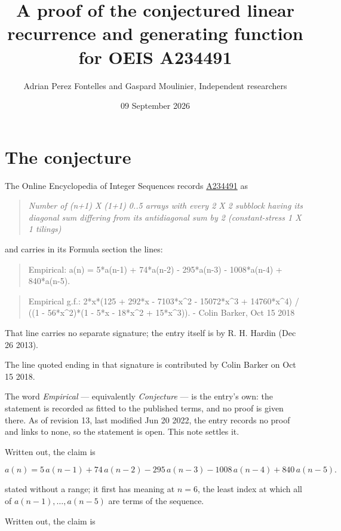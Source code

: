 \documentclass[11pt]{article}
\title{A proof of the conjectured linear recurrence and generating function for OEIS A234491}
\author{Adrian Perez Fontelles and Gaspard Moulinier, Independent researchers}
\date{09 September 2026}
\theoremstyle{definition}
\begin{document}
\maketitle
\section{The conjecture}

The Online Encyclopedia of Integer Sequences records \href{https://oeis.org/A234491}{A234491} as

\begin{quote}\itshape Number of (n+1) X (1+1) 0..5 arrays with every 2 X 2 subblock having its diagonal sum differing from its antidiagonal sum by 2 (constant-stress 1 X 1 tilings)\end{quote}

and carries in its Formula section the lines:

\begin{quote}\ttfamily Empirical: a(n) = 5*a(n-1) + 74*a(n-2) - 295*a(n-3) - 1008*a(n-4) + 840*a(n-5).\end{quote}

\begin{quote}\ttfamily Empirical g.f.: 2*x*(125 + 292*x - 7103*x\textasciicircum{}2 - 15072*x\textasciicircum{}3 + 14760*x\textasciicircum{}4) / ((1 - 56*x\textasciicircum{}2)*(1 - 5*x - 18*x\textasciicircum{}2 + 15*x\textasciicircum{}3)). - Colin Barker, Oct 15 2018\end{quote}

That line carries no separate signature; the entry itself is by R. H. Hardin (Dec 26 2013).

The line quoted ending in that signature is contributed by Colin Barker on Oct 15 2018.

The word {\itshape Empirical} --- equivalently {\itshape Conjecture} --- is the entry's own: the statement is recorded as fitted to the published terms, and no proof is given there. As of revision 13, last modified Jun 20 2022, the entry records no proof and links to none, so the statement is open. This note settles it.

Written out, the claim is

\[a(n) = 5\,a(n-1) + 74\,a(n-2) - 295\,a(n-3) - 1008\,a(n-4) + 840\,a(n-5).\]

stated without a range; it first has meaning at $n = 6$, the least index at which all of $a(n-1),\dots,a(n-5)$ are terms of the sequence.

Written out, the claim is
\end{document}
